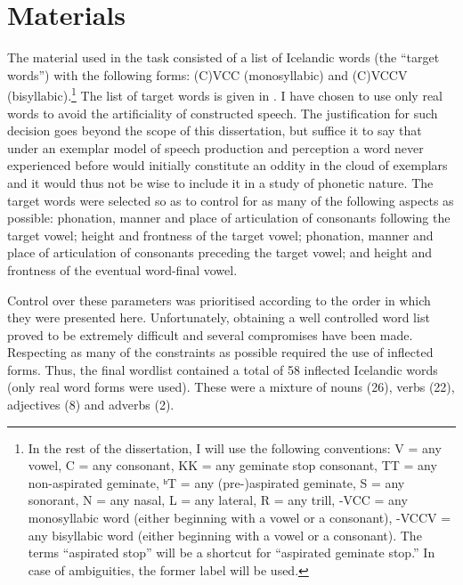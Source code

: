 \documentclass[11pt,a4paper,openany]{memoir}\usepackage[]{graphicx}\usepackage[]{color}
\begin{document}

\section{Materials}
\label{s:materials}

The material used in the task consisted of a list of Icelandic words (the ``target words'') with the following forms: (C)VCC (monosyllabic) and (C)VCCV (bisyllabic).\footnote{In the rest of the dissertation, I will use the following conventions: V = any vowel, C = any consonant, KK = any geminate stop consonant, TT = any non-aspirated geminate, ʰT = any (pre-)aspirated geminate, S = any sonorant, N = any nasal, L = any lateral, R = any trill, -VCC = any monosyllabic word (either beginning with a vowel or a consonant), -VCCV = any bisyllabic word (either beginning with a vowel or a consonant).
The terms ``aspirated stop'' will be a shortcut for ``aspirated geminate stop.''
In case of ambiguities, the former label will be used.
}
The list of target words is given in .
I have chosen to use only real words to avoid the artificiality of constructed speech.
The justification for such decision goes beyond the scope of this dissertation, but suffice it to say that under an exemplar model of speech production and perception \citep{johnson1997,pierrehumbert2001,bybee2002,johnson2007} a word never experienced before would initially constitute an oddity in the cloud of exemplars and it would thus not be wise to include it in a study of phonetic nature.
The target words were selected so as to control for as many of the following aspects as possible: phonation, manner and place of articulation of consonants following the target vowel; height and frontness of the target vowel; phonation, manner and place of articulation of consonants preceding the target vowel; and height and frontness of the eventual word-final vowel.

Control over these parameters was prioritised according to the order in which they were presented here.
Unfortunately, obtaining a well controlled word list proved to be extremely difficult and several compromises have been made.
Respecting as many of the constraints as possible required the use of inflected forms.
Thus, the final wordlist contained a total of 58 inflected Icelandic words (only real word forms were used).
These were a mixture of nouns (26), verbs (22), adjectives (8) and adverbs (2).
\end{document}
